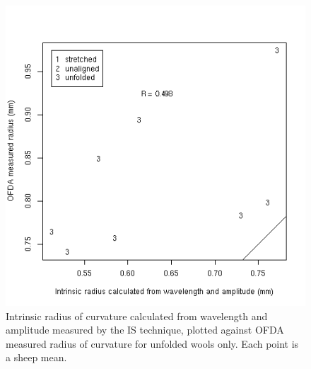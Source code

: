 %

\begin{figure}[!h]
  \centering
  \includegraphics[width=1.0\textwidth]{figwaradthetaunfoldis.png}
  \caption{Intrinsic radius of curvature calculated from wavelength and amplitude measured by the IS technique, plotted against OFDA measured radius of curvature for unfolded wools only. Each point is a sheep mean.}
  \label{fig:waradthetaunfoldis}
\end{figure}

%

